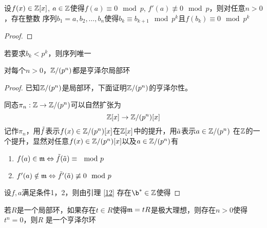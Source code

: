\documentclass[11pt]{article}
\begin{document}
\begin{corollary}[]
设\(f(x)\in\mathbb{Z}[x]\), \(a\in\mathbb{Z}\)使得\(f(a)\equiv 0\mod p\), \(f'(a)\not\equiv 0\mod p\)，则对任意\(n>0\)，存在整数
序列\(b_1=a,b_2,\dots,b_n\)使得\(b_k\equiv b_{k+1}\mod p^k\)且\(f(b_k)\equiv 0\mod p^k\)
\end{corollary}

\begin{proof}

\end{proof}

若要求\(b_k<p^k\)，则序列唯一

\begin{corollary}[]
对每个\(n>0\)，\(\mathbb{Z}/(p^n)\)都是亨泽尔局部环
\end{corollary}

\begin{proof}
已知\(\mathbb{Z}/(p^n)\)是局部环，下面证明\(\mathbb{Z}/(p^n)\)的亨泽尔性。

同态\(\pi_n:\mathbb{Z}\to\mathbb{Z}/(p^n)\)可以自然扩张为
\begin{equation*}
\mathbb{Z}[x]\to\mathbb{Z}/(p^n)[x]
\end{equation*}
记作\(\pi_n\)，用\(\tilde{f}\)表示\(f(x)\in\mathbb{Z}/(p^n)[x]\)在\(\mathbb{Z}[x]\)中的提升，用\(\tilde{a}\)表示\(a\in\mathbb{Z}/(p^n)\)
在\(\mathbb{Z}\)的一个提升，显然对任意\(f(x)\in\mathbb{Z}/(p^n)[x]\)以及\(a\in\mathbb{Z}/(p^n)\)有
\begin{enumerate}
\item \(f(a)\in\mathfrak{m}\Leftrightarrow\tilde{f}(\tilde{a})\equiv\mod p\)
\item \(f'(a)\notin\mathfrak{m}\Leftrightarrow\tilde{f}'(\tilde{a})\not\equiv 0\mod p\)
\end{enumerate}
设\(f,a\)满足条件1，2，则由引理 \ref{12} 存在\(\b^*\in\Z\)使得
\end{proof}

\begin{theorem}[]
若\(R\)是一个局部环，如果存在\(t\in R\)使得\(\mathfrak{m}=tR\)是极大理想，则存在\(n>0\)使得\(t^n=0\)，则\(R\)
是一个亨泽尔环
\end{theorem}
\end{document}
